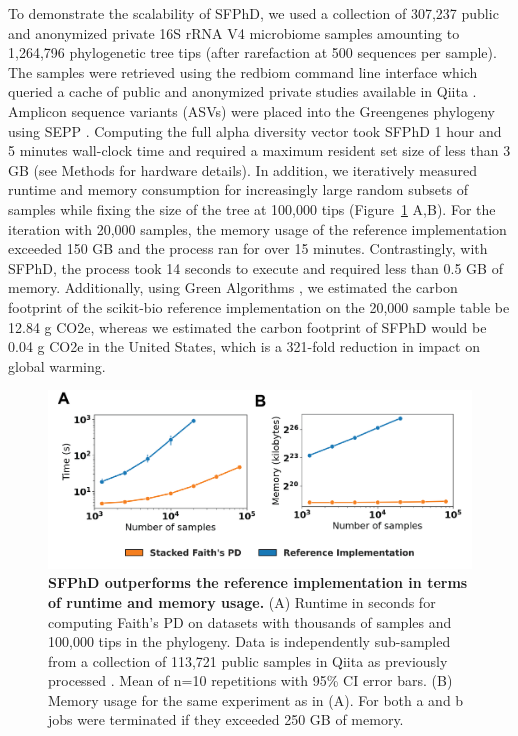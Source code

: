 To demonstrate the scalability of SFPhD, we used a collection of 307,237 public and anonymized private 16S rRNA V4 microbiome samples amounting to 1,264,796 phylogenetic tree tips (after rarefaction at 500 sequences per sample). The samples were retrieved using the redbiom command line interface \cite{McDonald2019-th} which queried a cache of public and anonymized private studies available in Qiita \cite{Gonzalez2018-ez}. Amplicon sequence variants (ASVs) were placed into the Greengenes \cite{Gonzalez2018-ez,McDonald2012-zv} phylogeny using SEPP \cite{Mirarab2012-jh}. Computing the full alpha diversity vector took SFPhD 1 hour and 5 minutes wall-clock time and required a maximum resident set size of less than 3 GB (see Methods for hardware details). In addition, we iteratively measured runtime and memory consumption for increasingly large random subsets of samples while fixing the size of the tree at 100,000 tips (Figure~\ref{faiths_pd_fig2} A,B). For the iteration with 20,000 samples, the memory usage of the reference implementation exceeded 150 GB and the process ran for over 15 minutes. Contrastingly, with SFPhD, the process took 14 seconds to execute and required less than 0.5 GB of memory. Additionally, using  Green Algorithms \cite{Lannelongue2021-vg}, we estimated the carbon footprint of the scikit-bio reference implementation on the 20,000 sample table be 12.84 g CO2e, whereas we estimated the carbon footprint of SFPhD would be 0.04 g CO2e in the United States, which is a 321-fold reduction in impact on global warming.

\begin{figure}[htbp]
\centering
\includegraphics[width=\textwidth]{faiths-pd-figures/figure02.png}
\caption[SFPhD outperforms the reference implementation in terms of runtime and memory usage.]{\textbf{SFPhD outperforms the reference implementation in terms of runtime and memory usage.} (A) Runtime in seconds for computing Faith’s PD on datasets with thousands of samples and 100,000 tips in the phylogeny. Data is independently sub-sampled from a collection of 113,721 public samples in Qiita \cite{Zhu2019-od, Gonzalez2018-ez} as previously processed \cite{McDonald2018-qq}. Mean of n=10 repetitions with 95\% CI error bars. (B) Memory usage for the same experiment as in (A). For both a and b jobs were terminated if they exceeded 250 GB of memory.}
\label{faiths_pd_fig2}
\end{figure}


